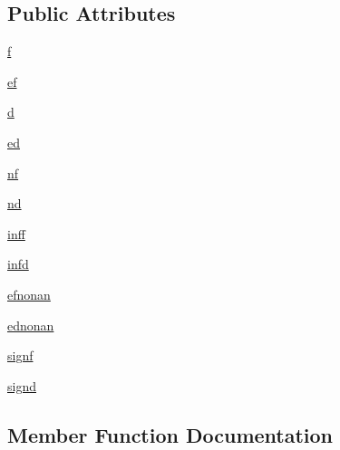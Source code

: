 \subsection*{Public Attributes}
\begin{DoxyCompactItemize}
\item 
\hyperlink{classnumpy_1_1core_1_1tests_1_1test__numeric_1_1TestBoolCmp_a1918b2f69b9b6c23e930552c06fbf180}{f}
\item 
\hyperlink{classnumpy_1_1core_1_1tests_1_1test__numeric_1_1TestBoolCmp_a898189a29cc3409c8337d1f96c5771b3}{ef}
\item 
\hyperlink{classnumpy_1_1core_1_1tests_1_1test__numeric_1_1TestBoolCmp_ac11adb42fbbe42d4ac1fec002ad1f6a0}{d}
\item 
\hyperlink{classnumpy_1_1core_1_1tests_1_1test__numeric_1_1TestBoolCmp_afcdcfd94e358502eed9e9217a91e49ee}{ed}
\item 
\hyperlink{classnumpy_1_1core_1_1tests_1_1test__numeric_1_1TestBoolCmp_a7771e04d5cd32b66ecc2cf835d4f89bf}{nf}
\item 
\hyperlink{classnumpy_1_1core_1_1tests_1_1test__numeric_1_1TestBoolCmp_ab6e5307ec3fea3f1eae8d8508ae651e3}{nd}
\item 
\hyperlink{classnumpy_1_1core_1_1tests_1_1test__numeric_1_1TestBoolCmp_a1e6d519bd7d05c44696078033934e551}{inff}
\item 
\hyperlink{classnumpy_1_1core_1_1tests_1_1test__numeric_1_1TestBoolCmp_a5e81344b11444723f61bd4af4ac2e9bb}{infd}
\item 
\hyperlink{classnumpy_1_1core_1_1tests_1_1test__numeric_1_1TestBoolCmp_a325f8dbebabd68b9b7effe230118c6e5}{efnonan}
\item 
\hyperlink{classnumpy_1_1core_1_1tests_1_1test__numeric_1_1TestBoolCmp_a7c9536878599b6f4e67b5b0f01bda4e2}{ednonan}
\item 
\hyperlink{classnumpy_1_1core_1_1tests_1_1test__numeric_1_1TestBoolCmp_a2d255fb5dc9ee8833ba11c69faf81947}{signf}
\item 
\hyperlink{classnumpy_1_1core_1_1tests_1_1test__numeric_1_1TestBoolCmp_a3ec9a80aa4039dbda3ce40e2c3be9222}{signd}
\end{DoxyCompactItemize}


\subsection{Member Function Documentation}
\mbox{\label{classnumpy_1_1core_1_1tests_1_1test__numeric_1_1TestBoolCmp_a47ae45f1587b027339cdfb45967b2d18}} 
